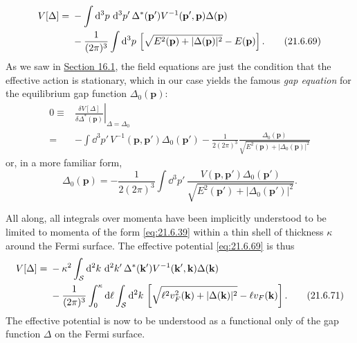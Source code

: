 \begin{align}
V[\Delta]={}&-\int \mathop{}\!\mathrm{d}^3p\,\mathop{}\!\mathrm{d}^3p'\,
\Delta^*(\mathbf p')V^{-1}(\mathbf p',\mathbf p)\Delta(\mathbf p)
\notag\\
&-\frac{1}{(2\pi)^3}\int \mathop{}\!\mathrm{d}^3p\,
\left[
\sqrt{E^2(\mathbf p)+|\Delta(\mathbf p)|^2}-E(\mathbf p)
\right].
\tag{21.6.69}\label{eq:21.6.69}
\end{align}
As we saw in \hyperref[sec:16.1]{Section 16.1}, the field equations are just the condition that the effective action is stationary, which in our case yields the famous \emph{gap equation} for the equilibrium gap function $\Delta_0(\mathbf p)$:
\begin{align*}
0
\equiv{}&
\left.
\frac{\delta V[\Delta]}{\delta\Delta^*(\mathbf p)}
\right|_{\Delta=\Delta_0}
\\
={}&-\int \dd^3p'\,
V^{-1}(\mathbf p,\mathbf p')\Delta_0(\mathbf p')
-\frac{1}{2(2\pi)^3}
\frac{\Delta_0(\mathbf p)}
{\sqrt{E^2(\mathbf p)+|\Delta_0(\mathbf p)|^2}}
\end{align*}
or, in a more familiar form,
\begin{equation}
\Delta_0(\mathbf p)
=-\frac{1}{2(2\pi)^3}
\int \dd^3p'\,
\frac{V(\mathbf p,\mathbf p')\Delta_0(\mathbf p')}
{\sqrt{E^2(\mathbf p')+|\Delta_0(\mathbf p')|^2}}.
\tag{21.6.70}\label{eq:21.6.70}
\end{equation}

All along, all integrals over momenta have been implicitly understood to be limited to momenta of the form \eqref{eq:21.6.39} within a thin shell of thickness $\kappa$ around the Fermi surface. The effective potential \eqref{eq:21.6.69} is thus
\begin{align}
V[\Delta]
={}&-\kappa^2\int_{\mathcal S}\mathop{}\!\mathrm{d}^2k\,\mathop{}\!\mathrm{d}^2k'\,
\Delta^*(\mathbf k')V^{-1}(\mathbf k',\mathbf k)\Delta(\mathbf k)
\notag\\
&-\frac{1}{(2\pi)^3}\int_0^\kappa \mathop{}\!\mathrm{d}\ell
\int_{\mathcal S}\mathop{}\!\mathrm{d}^2k\,
\left[
\sqrt{\ell^2v_F^2(\mathbf k)+|\Delta(\mathbf k)|^2}
-\ell v_F(\mathbf k)
\right].
\tag{21.6.71}\label{eq:21.6.71}
\end{align}
The effective potential is now to be understood as a functional only of the gap function $\Delta$ on the Fermi surface.

